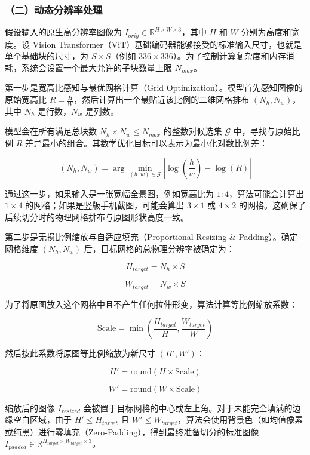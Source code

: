 \hypertarget{ux4e8cux52a8ux6001ux5206ux8fa8ux7387ux5904ux7406}{%
\subsubsection{（二）动态分辨率处理}\label{ux4e8cux52a8ux6001ux5206ux8fa8ux7387ux5904ux7406}}

假设输入的原生高分辨率图像为 \(I_{orig}\in\mathbb{R}^{H\times W\times 3}\)，其中 \(H\) 和 \(W\) 分别为高度和宽度。设 Vision Transformer（ViT）基础编码器能够接受的标准输入尺寸，也就是单个基础块的尺寸，为 \(S\times S\)（例如 \(336\times336\)）。为了控制计算复杂度和内存消耗，系统会设置一个最大允许的子块数量上限 \(N_{max}\)。

第一步是宽高比感知与最优网格计算（Grid Optimization）。模型首先感知图像的原始宽高比 \(R=\frac{H}{W}\)，然后计算出一个最贴近该比例的二维网格排布 \((N_h,N_w)\)，其中 \(N_h\) 是行数，\(N_w\) 是列数。

模型会在所有满足总块数 \(N_h\times N_w\le N_{max}\) 的整数对候选集 \(\mathcal{G}\) 中，寻找与原始比例 \(R\) 差异最小的组合。其数学优化目标可以表示为最小化对数比例差：

\[
(N_h,N_w)=\arg\min_{(h,w)\in\mathcal{G}}\left|\log\left(\frac{h}{w}\right)-\log(R)\right|
\]

通过这一步，如果输入是一张宽幅全景图，例如宽高比为 \(1:4\)，算法可能会计算出 \(1\times4\) 的网格；如果是竖版手机截图，可能会算出 \(3\times1\) 或 \(4\times2\) 的网格。这确保了后续切分时的物理网格排布与原图形状高度一致。

第二步是无损比例缩放与自适应填充（Proportional Resizing \& Padding）。确定网格维度 \((N_h,N_w)\) 后，目标网格的总物理分辨率被确定为：

\[
H_{target}=N_h\times S
\]

\[
W_{target}=N_w\times S
\]

为了将原图放入这个网格中且不产生任何拉伸形变，算法计算等比例缩放系数：

\[
\mathrm{Scale}=\min\left(\frac{H_{target}}{H},\frac{W_{target}}{W}\right)
\]

然后按此系数将原图等比例缩放为新尺寸 \((H',W')\)：

\[
H'=\mathrm{round}(H\times\mathrm{Scale})
\]

\[
W'=\mathrm{round}(W\times\mathrm{Scale})
\]

缩放后的图像 \(I_{resized}\) 会被置于目标网格的中心或左上角。对于未能完全填满的边缘空白区域，由于 \(H'\le H_{target}\) 且 \(W'\le W_{target}\)，算法会使用背景色（如均值像素或纯黑）进行零填充（Zero-Padding），得到最终准备切分的标准图像 \(I_{padded}\in\mathbb{R}^{H_{target}\times W_{target}\times3}\)。

